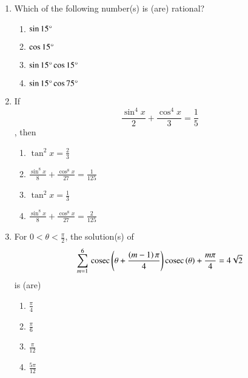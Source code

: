 \begin{enumerate}[label=\thesubsection.\arabic*,ref=\thesubsection.\theenumi]
\item Which of the following number(s) is (are) rational? \hfill{} 
\begin{multicols}{4}
\begin{enumerate}
    \item $\sin{15}\degree$
    \item $\cos{15}\degree$
    \item $\sin{15}\degree \cos{15}\degree$
    \item $\sin{15}\degree \cos{75}\degree$
\end{enumerate}
\end{multicols}
\item If $$\frac{\sin^4{x}}{2}+\frac{\cos^4{x}}{3}=\frac{1}{5}$$, then \hfill{} 
\begin{multicols}{2}
\begin{enumerate}
    \item $\tan^2{x}=\frac{2}{3}$
    \item $\frac{\sin^8{x}}{8}+\frac{\cos^8{x}}{27}=\frac{1}{125}$
    \item $\tan^2{x}=\frac{1}{3}$
    \item $\frac{\sin^8{x}}{8}+\frac{\cos^8{x}}{27}=\frac{2}{125}$
\end{enumerate}
\end{multicols}
\item For $ 0<\theta <\frac{\pi}{2}$, the solution(s) of $$\sum_{m=1}^{6}\,\text{cosec}\,{\left(\theta+\frac{\left(m-1\right)\pi}{4}\right)}\,\text{cosec}\,{{\left(\theta\right)+\frac{m\pi}{4}} }= 4\sqrt{2}$$ is (are) \hfill{}
\begin{multicols}{4}
\begin{enumerate}
    \item $\frac{\pi}{4}$
    \item $\frac{\pi}{6}$
    \item $\frac{\pi}{12}$
    \item $\frac{5\pi}{12}$
\end{enumerate}
\end{multicols}


\end{enumerate}
